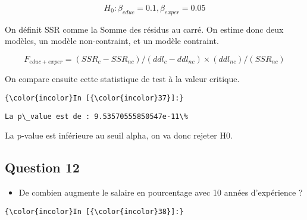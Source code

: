 \documentclass[11pt]{article}
\providecommand{\tightlist}{%
      \setlength{\itemsep}{0pt}\setlength{\parskip}{0pt}}
\begin{document}
\[ H_0 : \beta_{educ} = 0.1, \beta_{exper} = 0.05 \]

On définit SSR comme la Somme des résidus au carré. On estime donc deux
modèles, un modèle non-contraint, et un modèle contraint.

\[ F_{educ + exper} = ( SSR_c - SSR_{nc} ) / ( ddl_c - ddl_{nc} ) \times ( ddl_{nc} ) / (SSR_{nc}) \]

On compare ensuite cette statistique de test à la valeur critique.

    \begin{Verbatim}[commandchars=\\\{\}]
{\color{incolor}In [{\color{incolor}37}]:} 
\end{Verbatim}


    \begin{Verbatim}[commandchars=\\\{\}]
La p\_value est de : 9.53570555850547e-11\%

    \end{Verbatim}

    La p-value est inférieure au seuil alpha, on va donc rejeter H0.

    \subsection{Question 12}\label{question-12}

\begin{itemize}
\tightlist
\item
  De combien augmente le salaire en pourcentage avec 10 années
  d'expérience ?
\end{itemize}

    \begin{Verbatim}[commandchars=\\\{\}]
{\color{incolor}In [{\color{incolor}38}]:} 
\end{Verbatim}
\end{document}
